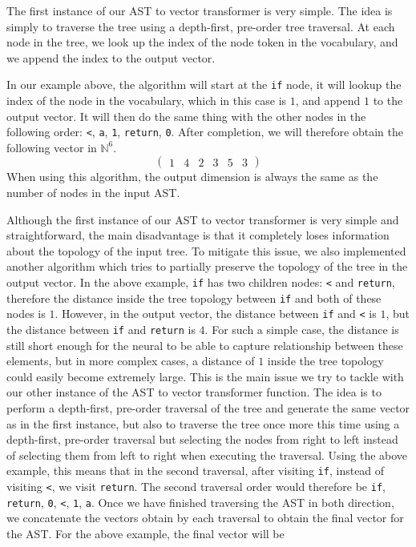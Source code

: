 The first instance of our AST to vector transformer is very simple. The idea is
simply to traverse the tree using a depth-first, pre-order tree traversal. At
each node in the tree, we look up the index of the node token in the vocabulary,
and we append the index to the output vector.

In our example above, the algorithm will start at the \lstinline{if} node, it
will lookup the index of the node in the vocabulary, which in this case is $1$,
and append $1$ to the output vector. It will then do the same thing with the
other nodes in the following order: \lstinline{<}, \lstinline{a}, \lstinline{1},
\lstinline{return}, \lstinline{0}. After completion, we will therefore obtain
the following vector in $\mathbb{N}^6$.
\begin{equation}
  \label{eq:sample-indexes-vector}
  \begin{pmatrix}1 & 4 & 2 & 3 & 5 & 3\end{pmatrix}
\end{equation}
When using this algorithm, the output dimension is always the same as the
number of nodes in the input AST.

Although the first instance of our AST to vector transformer is very simple and
straightforward, the main disadvantage is that it completely loses information
about the topology of the input tree. To mitigate this issue, we also
implemented another algorithm which tries to partially preserve the topology of
the tree in the output vector. In the above example, \lstinline{if} has two
children nodes: \lstinline{<} and \lstinline{return}, therefore the distance
inside the tree topology between \lstinline{if} and both of these nodes is $1$.
However, in the output vector, the distance between \lstinline{if} and
\lstinline{<} is $1$, but the distance between \lstinline{if} and
\lstinline{return} is $4$. For such a simple case, the distance is still short
enough for the neural to be able to capture relationship between these elements,
but in more complex cases, a distance of $1$ inside the tree topology could
easily become extremely large. This is the main issue we try to tackle with our
other instance of the AST to vector transformer function. The idea is to perform
a depth-first, pre-order traversal of the tree and generate the same vector as
in the first instance, but also to traverse the tree once more this time using a
depth-first, pre-order traversal but selecting the nodes from right to left
instead of selecting them from left to right when executing the traversal. Using
the above example, this means that in the second traversal, after visiting
\lstinline{if}, instead of visiting \lstinline{<}, we visit \lstinline{return}.
The second traversal order would therefore be \lstinline{if},
\lstinline{return}, \lstinline{0}, \lstinline{<}, \lstinline{1}, \lstinline{a}.
Once we have finished traversing the AST in both direction, we concatenate the
vectors obtain by each traversal to obtain the final vector for the AST. For the
above example, the final vector will be

